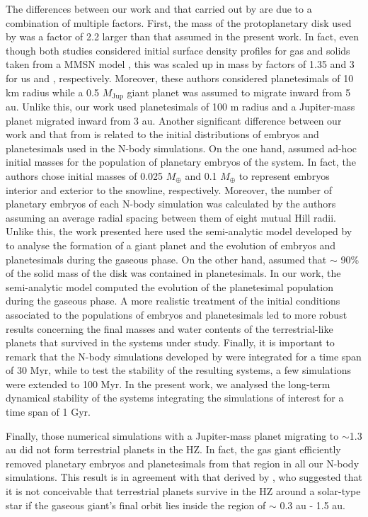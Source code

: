 \documentclass{aa}
\begin{document}
The differences between our work and that carried out by \citet{Fogg2009} are due to a combination of multiple
factors. First, the mass of the protoplanetary disk used by \citet{Fogg2009} was a factor of 2.2 larger than that assumed in the
present work. In fact, even though both studies considered initial surface density profiles for gas and solids
taken from a MMSN model \citep{Hayashi1981}, this was scaled up in mass by factors of 1.35 and 3 for us and \citet{Fogg2009}, respectively. Moreover, these authors considered planetesimals of 10 km radius while a 0.5 $M_\text{Jup}$ giant
planet was assumed to migrate inward from 5 au. Unlike this, our work used planetesimals of 100 m radius and a Jupiter-mass planet
migrated inward from 3 au. Another significant difference between our work and that from \citet{Fogg2009} is related to the initial
distributions of embryos and planetesimals used in the N-body simulations. On the one hand, \citet{Fogg2009} assumed ad-hoc initial
masses for the population of planetary embryos of the system. In fact, the authors chose initial masses of 0.025 $M_\oplus$ and 0.1
$M_\oplus$ to represent embryos interior and exterior to the snowline, respectively. Moreover, the number of planetary embryos of each
N-body simulation was calculated by the authors assuming an average radial spacing between them of eight mutual Hill radii. Unlike this,
the work presented here used the semi-analytic model developed by \citet{Guilera2010} to analyse the formation of a giant planet
and the evolution of embryos and planetesimals during the gaseous phase. On the other hand, \citet{Fogg2009} assumed that $\sim$
90\% of the solid mass of the disk was contained in planetesimals. In our work, the semi-analytic model computed the evolution of the
planetesimal population during the gaseous phase. A more realistic treatment of the initial conditions associated to the populations
of embryos and planetesimals led to more robust results concerning the final masses and water contents of the terrestrial-like planets
that survived in the systems under study. Finally, it is important to remark that the N-body simulations developed by \citet{Fogg2009} were integrated for a time span of 30 Myr, while to test the stability of the resulting systems, a few simulations were extended
to 100 Myr. In the present work, we analysed the long-term dynamical stability of the systems integrating the simulations of
interest for a time span of 1 Gyr.

Finally, those numerical simulations with a Jupiter-mass planet migrating to $\sim$1.3 au did not form terrestrial planets in the HZ.
In fact, the gas giant efficiently removed planetary embryos and planetesimals from that region in all our N-body simulations.
This result is in agreement with that derived by \citet{Fogg2009}, who suggested that it is not conceivable that terrestrial planets survive in the HZ around a solar-type star if the gaseous giant's final orbit lies inside the region of $\sim$ 0.3 au - 1.5 au.
\end{document}

